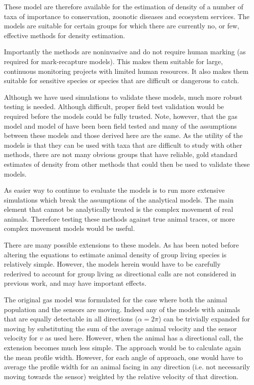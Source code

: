 \documentclass[a4paper,10pt,reqno,oneside]{amsart}
\begin{document}
These model are therefore available for the estimation of density of a number of taxa of importance to conservation, zoonotic diseases and ecosystem services. The models are suitable for certain groups for which there are currently no, or few, effective methods for density estimation. 

Importantly the methods are noninvasive and do not require human marking (as required for mark-recapture models). This makes them suitable for large, continuous monitoring projects with limited human resources. It also makes them suitable for sensitive species or species that are difficult or dangerous to catch.

Although we have used simulations to validate these models, much more robust testing is needed. Although difficult, proper field test validation would be required before the models could be fully trusted. Note, however, that the gas model and model of \cite{rowcliffe2008estimating} have been been field tested and many of the assumptions between these models and those derived here are the same. As the utility of the models is that they can be used with taxa that are difficult to study with other methods, there are not many obvious groups that have reliable, gold standard estimates of density from other methods that could then be used to validate these models.

As easier way to continue to evaluate the models is to run more extensive simulations which break the assumptions of the analytical models. The main element that cannot be analytically treated is the complex movement of real animals. Therefore testing these methods against true animal traces, or more complex movement models would be useful.

There are many possible extensions to these models. As has been noted before \citep{rowcliffe2008estimating,Hutchinson_Waser_2007} altering the equations to estimate animal density of group living species is relatively simple. However, the models herein would have to be carefully rederived to account for group living as directional calls are not considered in previous work, and may have important effects.

The original gas model was formulated for the case where both the animal population and the sensors are moving. Indeed any of the models with animals that are equally detectable in all directions ($\alpha = 2\pi$) can be trivially expanded for moving by substituting the sum of the average animal velocity and the sensor velocity for $v$ as used here. However, when the animal has a directional call, the extension becomes much less simple. The approach would be to calculate again the mean profile width. However, for each angle of approach, one would have to average the profile width for an animal facing in any direction (i.e. not necessarily moving towards the sensor) weighted by the relative velocity of that direction.
\end{document}

